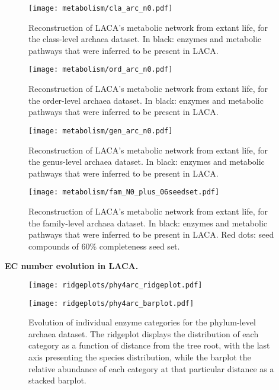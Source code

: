 \begin{figure}[H]
    \centering
    \texttt{[image: metabolism/cla\_arc\_n0.pdf]}
    \caption{Reconstruction of LACA's metabolic network from extant life, for the class-level archaea dataset. In black: enzymes and metabolic pathways that were inferred to be present in LACA.}
    \label{cla4arc_metnet}
\end{figure}   

\begin{figure}[H]
    \centering
    \texttt{[image: metabolism/ord\_arc\_n0.pdf]}
    \caption{Reconstruction of LACA's metabolic network from extant life, for the order-level archaea dataset. In black: enzymes and metabolic pathways that were inferred to be present in LACA.}
    \label{ord4arc_metnet}
\end{figure}   

\begin{figure}[H]
    \centering
    \texttt{[image: metabolism/gen\_arc\_n0.pdf]}
    \caption{Reconstruction of LACA's metabolic network from extant life, for the genus-level archaea dataset. In black: enzymes and metabolic pathways that were inferred to be present in LACA.}
    \label{gen4arc_metnet}
\end{figure}   


\begin{figure}[H]
    \centering
    \texttt{[image: metabolism/fam\_N0\_plus\_06seedset.pdf]}
    \caption{Reconstruction of LACA's metabolic network from extant life, for the family-level archaea dataset. In black: enzymes and metabolic pathways that were inferred to be present in LACA. Red dots: seed compounds of 60\% completeness seed set.}
    \label{fam4arc_metnet_plus_seedset}
\end{figure}   

\newpage
\textbf{EC number evolution in LACA.}
\begin{figure}[H]
    \centering
    \texttt{[image: ridgeplots/phy4arc\_ridgeplot.pdf]}
    \label{ridgeplot_phy4arc}
\end{figure}

\begin{figure}[H]
    \centering
    \texttt{[image: ridgeplots/phy4arc\_barplot.pdf]}
    \caption[]{Evolution of individual enzyme categories for the phylum-level archaea dataset. The ridgeplot displays the distribution of each category as a function of distance from the tree root, with the last axis presenting the species distribution, while the barplot the relative abundance of each category at that particular distance as a stacked barplot.}
    \label{barplot_phy4arc}
\end{figure}

